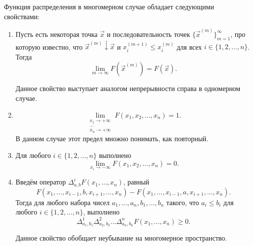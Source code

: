 \begin{lemma}
	Функция распределения в многомерном случае обладает следующими свойствами:
	\begin{enumerate}
		\item Пусть есть некоторая точка \(\vec{x}\) и последовательность точек \(\{\vec{x}^{(m)}\}_{m = 1}^{\infty}\), про которую известно, что \(\vec{x}^{(m)} \downarrow \vec{x}\) и \(x_{i}^{(m + 1)} \leq x_{i}^{(m)}\) для всех \(i \in \{1, 2, \dots, n\}\). Тогда
		\[
		\lim\limits_{m \to \infty} F(\vec{x}^{(m)}) = F(\vec{x}).
		\]
		
		Данное свойство выступает аналогом непрерывности справа в одномерном случае.
		
		\item 
		\[
		\lim\limits_{\substack{x_1 \to +\infty \\ \dots \\ x_n \to +\infty}} F(x_1, x_2, \dots, x_n) = 1.
		\]
		В данном случае этот предел множно понимать, как повторный.
		
		\item Для любого \(i \in \{1, 2, \dots, n\}\) выполнено
		\[
		\lim\limits_{x_i \to -\infty} F(x_1, x_2, \dots, x_n) = 0.
		\]
		
		\item Введём оператор \(\Delta_{a, b}^{i} F(x_1, \dots, x_n)\), равный
		\[
		F(x_1, \dots, x_{i - 1}, b, x_{i + 1}, \dots, x_n) - F(x_1, \dots, x_{i - 1}, a, x_{i + 1}, \dots, x_n).
		\]
		Тогда для любого набора чисел \(a_1, \dots, a_n, b_1, \dots, b_n\) такого, что \(a_i \leq b_i\) для любого \(i \in \{1, 2, \dots, n\}\), выполнено
		\[
		\Delta_{a_1, b_1}^{1} \Delta_{a_2, b_2}^{2} \dots \Delta_{a_n, b_n}^{n} F(x_1, \dots, x_n) \geq 0.
		\]
		
		Данное свойство обобщает неубывание на многомерное пространство.
	\end{enumerate}
\end{lemma}
